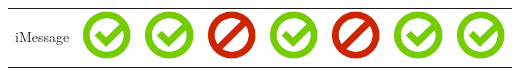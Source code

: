 \documentclass[10pt,foldmark,tumble]{leaflet}
\begin{document}
{\begin{tabular}{ L{2cm} | C{2cm} | C{2cm} | C{2cm} | C{2cm} | C{2cm} | C{2cm} | C{2cm} | }
iMessage & \includegraphics[scale=0.1]{pics/haken.png} & \includegraphics[scale=0.1]{pics/haken.png} & \includegraphics[scale=0.1]{pics/nohaken.png} & \includegraphics[scale=0.1]{pics/haken.png} & \includegraphics[scale=0.1]{pics/nohaken.png} & \includegraphics[scale=0.1]{pics/haken.png} & \includegraphics[scale=0.1]{pics/haken.png} \tabularnewline

\end{tabular}}
\end{document}
